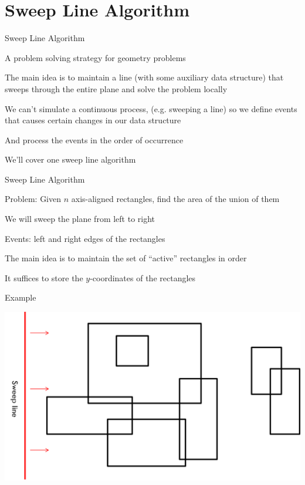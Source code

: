 \documentclass[13pt,onlymath]{beamer}
\begin{document}
\section{Sweep Line Algorithm}

\begin{frame}{Sweep Line Algorithm}
\BIT
\item A problem solving strategy for geometry problems
\item The main idea is to maintain a line (with some auxiliary data structure) that sweeps through the entire plane and solve the problem locally
\item We can't simulate a continuous process, (e.g. sweeping a line) so we define events that causes certain changes in our data structure
\BIT
\item And process the events in the order of occurrence
\EIT
\item We'll cover one sweep line algorithm
\EIT
\end{frame}

\begin{frame}{Sweep Line Algorithm}
\BIT
\item Problem: Given $n$ axis-aligned rectangles, find the area of the union of them
\item We will sweep the plane from left to right
\item Events: left and right edges of the rectangles
\item The main idea is to maintain the set of ``active'' rectangles in order
\BIT
\item It suffices to store the $y$-coordinates of the rectangles
\EIT \EIT
\end{frame}

\begin{frame}{Example}
\begin{center}
\includegraphics[height=0.6\textheight]{figures/sweep1}
\end{center}
\end{frame}
\end{document}
